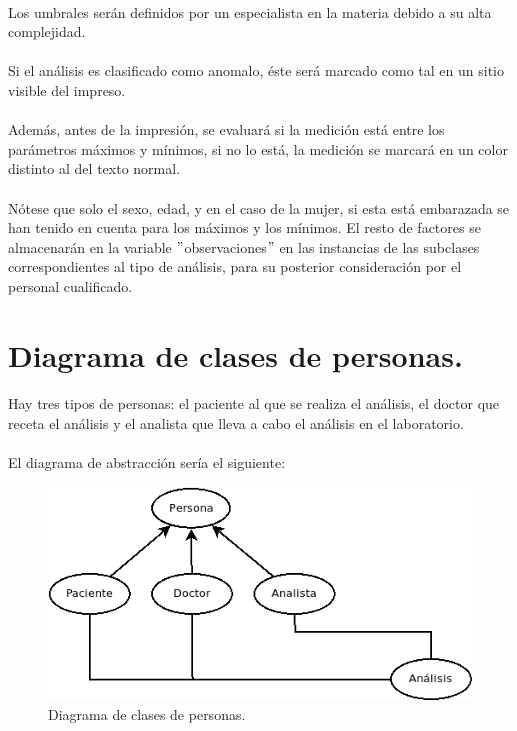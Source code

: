 \documentclass[a4paper,10pt]{article}
\begin{document}
\paragraph{}
Los umbrales serán definidos por un especialista en la materia debido a su alta complejidad.
\paragraph{}
Si el análisis es clasificado como anomalo, éste será marcado como tal en un sitio visible del impreso.
\paragraph{}
Además, antes de la impresión, se evaluará si la medición está entre los parámetros máximos y mínimos, si no lo está, la medición se marcará en un color distinto al del texto normal.
\paragraph{}
Nótese que solo el sexo, edad, y en el caso de la mujer, si esta está embarazada se han tenido en cuenta para los máximos y los mínimos. El resto de factores se almacenarán en la variable $"$observaciones$"$ en las instancias de las subclases correspondientes al tipo de análisis, para su posterior consideración por el personal cualificado.
\pagebreak

\section{Diagrama de clases de personas.}
\paragraph{}
Hay tres tipos de personas: el paciente al que se realiza el análisis, el doctor que receta el análisis y el analista que lleva a cabo el análisis en el laboratorio.
\paragraph{}
El diagrama de abstracción sería el siguiente:
\vspace{0.5cm}
\begin{center}
	\begin{figure}[hbt]
		\includegraphics[width=\textwidth]{img/personas.png}
		\caption{Diagrama de clases de personas.}
		\label{fig:diagramapersonas}
	\end{figure}
\end{center}
\end{document}

